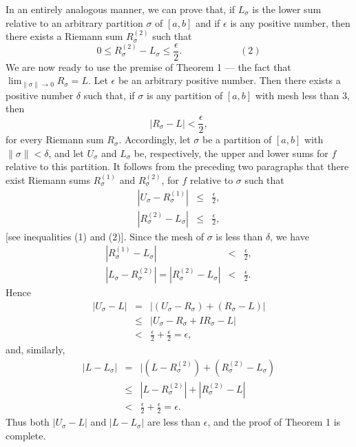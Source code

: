 In an entirely analogous manner, we can prove that, if $L_\sigma$ is the lower sum relative to an arbitrary partition $\sigma$ of $[a, b]$ and if $\epsilon$ is any positive number, then there exists a Riemann sum $R_\sigma^{(2)}$ such that
$$
0 \leq R_\sigma^{(2)} - L_\sigma \leq \frac{\epsilon}{2} . \hspace{1in}( 2 )
$$
We are now ready to use the premise of Theorem 1 --- the fact that $\lim_{\|\sigma\| \rightarrow 0} R_\sigma = L$. Let $\epsilon$ be an arbitrary positive number. Then there exists a positive number $\delta$ such that, if $\sigma$ is any partition of $[a, b]$ with mesh less than 3, then
$$
|R_\sigma - L| < \frac{\epsilon}{2},
$$
for every Riemann sum $R_\sigma$. Accordingly, let $\sigma$ be a partition of $[a, b]$ with $\| \sigma \| < \delta$, and let $U_\sigma$ and $L_\sigma$ be, respectively, the upper and lower sums for $f$ relative to this partition. It follows from the preceding two paragraphs that there exist Riemann sums $R_\sigma^{(1)}$ and $R_\sigma^{(2)}$, for $f$ relative to $\sigma$ such that
\begin{eqnarray*}
|U_\sigma - R_\sigma^{(1)}| &\leq& \frac{\epsilon}{2} , \\
|R_\sigma^{(2)} - L_\sigma| &\leq& \frac{\epsilon}{2} ,
\end{eqnarray*}
[see inequalities (1) and (2)]. Since the mesh of $\sigma$ is less than $\delta$, we have 
\begin{eqnarray*}
                                               |R_\sigma^{(1)} - L_\sigma|  &<& \frac{\epsilon}{2} ,\\
|L_\sigma - R_\sigma^{(2)} | = |R_\sigma^{(2)} - L_\sigma| &<& \frac{\epsilon}{2} .
\end{eqnarray*}
Hence 
\begin{eqnarray*}
|U_\sigma - L| 
&=& |(U_\sigma - R_\sigma) + (R_\sigma - L)| \\
&\leq& |U_\sigma - R_\sigma + I R_\sigma - L | \\
&<& \frac{\epsilon}{2}  + \frac{\epsilon}{2}  = \epsilon,
\end{eqnarray*}
and, similarly,
\begin{eqnarray*}
|L - L_\sigma|
&=& |(L - R_\sigma^{(2)}) + (R_\sigma ^{(2)} - L_\sigma)\\
&\leq& |L - R_\sigma ^{(2)}| + |R_\sigma ^{(2)} - L |\\
&<& \frac{\epsilon}{2}  + \frac{\epsilon}{2}  = \epsilon .
\end{eqnarray*}
Thus both $|U_\sigma - L|$ and $|L - L_\sigma|$ are less than $\epsilon$, and the proof of Theorem 1 is complete.

